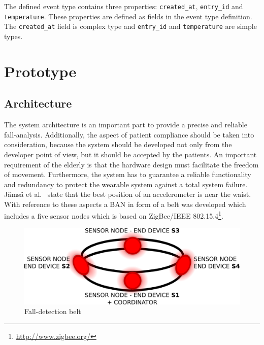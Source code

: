 \documentclass[review]{elsarticle}
\begin{document}
The defined event type contains three properties: \texttt{created\_at},
\texttt{entry\_id} and \texttt{temperature}. These properties are defined as
fields in the event type definition. The \texttt{created\_at} field is complex
type and \texttt{entry\_id} and \texttt{temperature} are simple types. 


\section{Prototype}
\label{sec:basicprototype}

\subsection{Architecture}
\label{sub:basicprototypearchitecture}

The system architecture is an important part to provide a precise and reliable fall-analysis. 
Additionally, the aspect of patient compliance should be taken into consideration, because the 
system should be developed not only from the developer point of view, but it should be accepted 
by the patients. An important requirement of the elderly is that the hardware design must 
facilitate the freedom of movement. Furthermore, the system has to guarantee a reliable 
functionality and redundancy to protect the wearable system against
a total system failure. J{\"a}ms{\"a} et al.~\cite{jamsa2014fall} state that the best
position of an accelerometer is near the waist.
With reference to these aspects a BAN in form of a belt was developed which 
includes a five sensor nodes which is based on ZigBee/IEEE 802.15.4\footnote{\url{http://www.zigbee.org/}}.

\begin{figure}[!ht]
  \centering
  \includegraphics[scale=0.25]{./img/belt}
  \caption[Fall-detection belt]{Fall-detection belt~\cite{LaBlunda.2016,LaBlunda.2016b}}
  \label{fig:belt}
\end{figure}
\end{document}
